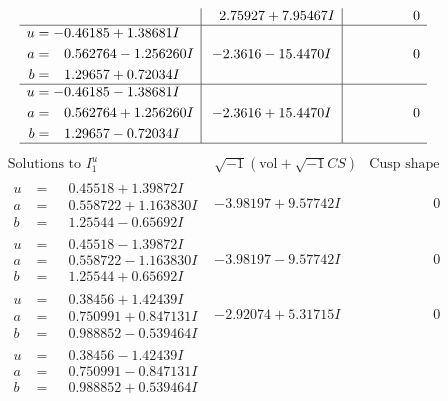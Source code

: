 \documentclass[1p]{elsarticle_modified}
\theoremstyle{definition}
\newcommand{\I}{\sqrt{-1}}
\begin{document}
$$\begin{array}{c|c|c}
 & \phantom{-}2.75927 + 7.95467 I & \phantom{-0.000000 } 0 \\ \hline\begin{aligned}
u &= -0.46185 + 1.38681 I \\
a &= \phantom{-}0.562764 - 1.256260 I \\
b &= \phantom{-}1.29657 + 0.72034 I\end{aligned}
 & -2.3616 - 15.4470 I & \phantom{-0.000000 } 0 \\ \hline\begin{aligned}
u &= -0.46185 - 1.38681 I \\
a &= \phantom{-}0.562764 + 1.256260 I \\
b &= \phantom{-}1.29657 - 0.72034 I\end{aligned}
 & -2.3616 + 15.4470 I & \phantom{-0.000000 } 0\\
 \hline 
 \end{array}$$\newpage$$\begin{array}{c|c|c}  
\text{Solutions to }I^u_{1}& \I (\text{vol} + \sqrt{-1}CS) & \text{Cusp shape}\\
 \hline 
\begin{aligned}
u &= \phantom{-}0.45518 + 1.39872 I \\
a &= \phantom{-}0.558722 + 1.163830 I \\
b &= \phantom{-}1.25544 - 0.65692 I\end{aligned}
 & -3.98197 + 9.57742 I & \phantom{-0.000000 } 0 \\ \hline\begin{aligned}
u &= \phantom{-}0.45518 - 1.39872 I \\
a &= \phantom{-}0.558722 - 1.163830 I \\
b &= \phantom{-}1.25544 + 0.65692 I\end{aligned}
 & -3.98197 - 9.57742 I & \phantom{-0.000000 } 0 \\ \hline\begin{aligned}
u &= \phantom{-}0.38456 + 1.42439 I \\
a &= \phantom{-}0.750991 + 0.847131 I \\
b &= \phantom{-}0.988852 - 0.539464 I\end{aligned}
 & -2.92074 + 5.31715 I & \phantom{-0.000000 } 0 \\ \hline\begin{aligned}
u &= \phantom{-}0.38456 - 1.42439 I \\
a &= \phantom{-}0.750991 - 0.847131 I \\
b &= \phantom{-}0.988852 + 0.539464 I\end{aligned}

\end{array}$$
\end{document}
